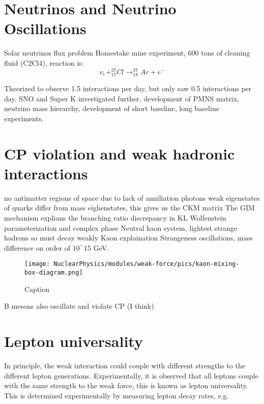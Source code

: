             
    \section{Neutrinos and Neutrino Oscillations}
        Solar neutrinos flux problem
            Homestake mine experiment, 600 tons of cleaning fluid (C2Cl4), reaction is:\\
            \begin{equation}
                \nu_e + ^37_17Cl \longrightarrow ^37_18Ar + e^- 
            \end{equation}
            
            Theorized to observe 1.5 interactions per day, but only saw 0.5 interactions per day. 
            SNO and Super K investigated further, development of PMNS matrix, neutrino mass hierarchy, development of short baseline, long baseline experiments.
            
            
    \section{CP violation and weak hadronic interactions}
            no antimatter regions of space due to lack of anniliation photons
            weak eigenstates of quarks differ from mass eighenstates, this gives us the CKM matrix
            The GIM mechanism explians the branching ratio discrepancy in KL
            Wolfenstein parameterization and complex phase
            Neutral kaon system, lightest strange hadrons so must decay weakly
            Kaon explaination
            Strangeness oscillations, mass difference on order of $10^-15$ GeV. 
            
            \begin{figure}[H]
                \centering
                \texttt{[image: NuclearPhysics/modules/weak-force/pics/kaon-mixing-box-diagram.png]}
            \caption{Caption}
            \end{figure}
            
            
            B mesons also oscillate and violate CP (I think)
            
            
    \section{Lepton universality}
        \indent In principle, the weak interaction could couple with different strengths to the different lepton generations. Experimentally, it is observed that all leptons couple with the same strength to the weak force, this is known as lepton universality. This is determined experimentally by measuring lepton decay rates, e.g.  
        
